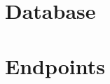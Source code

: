 
\begin{appendices}

\chapter{Database} \label{app:Database}

\chapter{Endpoints} 

\end{appendices}
